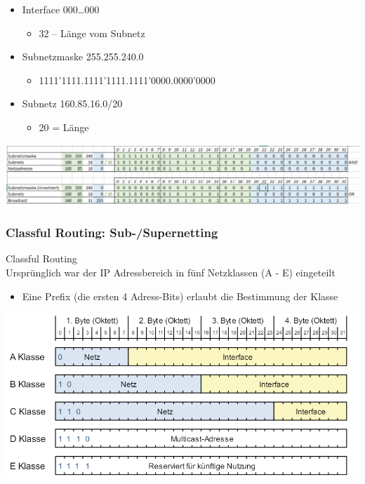 \begin{example}
    \begin{itemize}
        \item Interface 000…000 
        \begin{itemize}
            \item 32 – Länge vom Subnetz
        \end{itemize}
        \item Subnetzmaske 255.255.240.0 
        \begin{itemize}
            \item 1111’1111.1111’1111.1111’0000.0000’0000
        \end{itemize}
        \item Subnetz 160.85.16.0/20 
        \begin{itemize}
            \item 20 = Länge
        \end{itemize}
    \end{itemize}
    \includegraphics[width=1\linewidth]{images/ipv4_example.png}
\end{example}

\subsubsection{Classful Routing: Sub-/Supernetting}

\begin{concept}{Classful Routing}\\
    Ursprünglich war der IP Adressbereich in fünf Netzklassen (A - E) eingeteilt
    \begin{itemize}
        \item Eine Prefix (die ersten 4 Adress-Bits) erlaubt die Bestimmung der Klasse
    \end{itemize}
        \includegraphics[width=1\linewidth]{images/classfulrouitng.png}
\end{concept}

